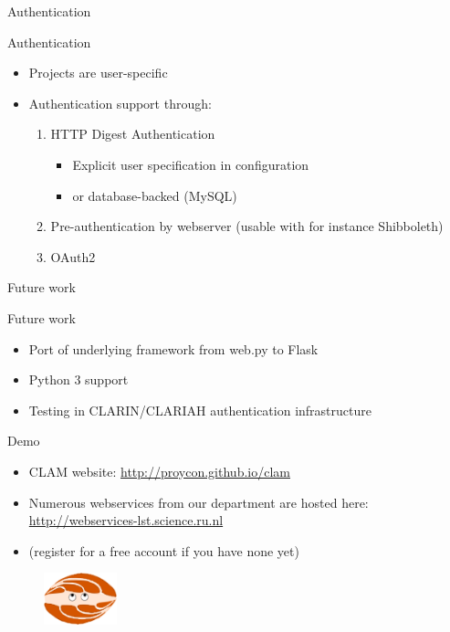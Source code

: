 \documentclass[xcolor=table,10pt,t]{beamer}
\begin{document}
\begin{frame}{Authentication}
  \begin{block}{Authentication}
      \begin{itemize}
        \item Projects are user-specific
        \item Authentication support through:
        \begin{enumerate}
            \item HTTP Digest Authentication
            \begin{itemize}
                \item Explicit user specification in configuration
                \item or database-backed (MySQL)
            \end{itemize}
            \item Pre-authentication by webserver (usable with for instance Shibboleth)
            \item OAuth2
        \end{enumerate}
       \end{itemize}
  \end{block}
\end{frame}



\begin{frame}{Future work}
  \begin{block}{Future work}
      \begin{itemize}
        \item Port of underlying framework from web.py to Flask
        \item Python 3 support
        \item Testing in CLARIN/CLARIAH authentication infrastructure
      \end{itemize}
  \end{block}
\end{frame}


\begin{frame}{Demo}
  \begin{block}{}
      \begin{itemize}
        \item CLAM website: \url{http://proycon.github.io/clam}
      \end{itemize}

      \begin{itemize}
        \item Numerous webservices from our department are hosted here:
          \url{http://webservices-lst.science.ru.nl}
        \item (register for a free account if you have none yet)
      \end{itemize}
      \medskip
        \begin{figure}
          \includegraphics[height=1.5cm]{clamup.png}
        \end{figure}
  \end{block}
\end{frame}
\end{document}
